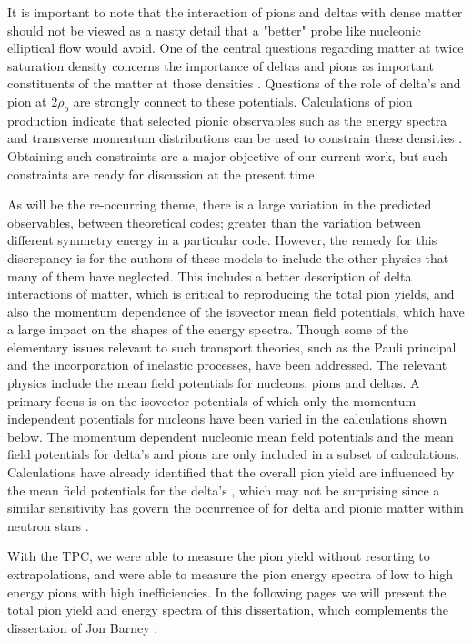 It is important to note that the interaction of pions and deltas with dense matter should not be viewed as a nasty detail that a "better" probe like nucleonic elliptical flow would avoid. One of the central questions regarding matter at twice saturation density concerns the importance of deltas and pions as important constituents of the matter at those densities \cite{pionNS,deltaNS,awayforward}. Questions of the role of delta's and pion at 2$\rho_o$ are strongly connect to these potentials. Calculations of pion production indicate that selected pionic observables such as the energy spectra and transverse momentum distributions can be used to constrain these densities \cite{cozmaPC}. Obtaining such constraints are a major objective of our current work, but such constraints are ready for discussion at the present time. 

As will be the re-occurring theme, there is a large variation in the predicted observables, between theoretical codes; greater than the variation between different symmetry energy in a particular code. However, the remedy for this discrepancy is for the authors of these models to include the other physics that many of them have neglected. This includes a better description of delta interactions of matter, which is critical to reproducing the total pion yields, and also the momentum dependence of the isovector mean field potentials, which have a large impact on the shapes of the energy spectra. Though some of the elementary issues relevant to such transport theories, such as the Pauli principal and the incorporation of inelastic processes, have been addressed. The relevant physics include the mean field potentials for nucleons, pions and deltas. A primary focus is on the isovector potentials of which only the momentum independent potentials for nucleons have been varied in the calculations shown below. The momentum dependent nucleonic mean field potentials and the mean field potentials for delta's and pions are only included in a subset of calculations. Calculations have already identified that the overall pion yield are influenced by the mean field potentials for the delta's \cite{cozmaPC}, which may not be surprising since a similar sensitivity has govern the occurrence of for delta and pionic matter within neutron stars \cite{deltaNS,pionNS}.  

With the \spirit TPC, we were able to measure the pion yield without resorting to extrapolations, and were able to measure the pion energy spectra of low to high energy pions with high inefficiencies. In the following pages we will present the total pion yield and energy spectra of this dissertation, which complements the dissertaion of Jon Barney \cite{jon}.


